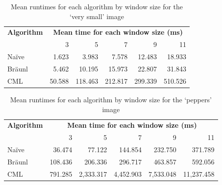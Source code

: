 \begin{table}
\centering
\caption[Mean runtimes for each algorithm for the `very small' image]{Mean runtimes for each algorithm by window size for the `very small' image}
\label{tab:median:verysmall}
\begin{tabular}{@{}lrrrrr@{}}
\toprule
\multicolumn{1}{c}{\textbf{Algorithm}} & \multicolumn{5}{c}{\textbf{Mean time for each window size (ms)}} \\
                              & 3        & 5         & 7         & 9         & 11       \\ \midrule
Naïve                         & 1.623    & 3.983     & 7.578     & 12.483    & 18.933   \\
Bräunl                        & 5.462    & 10.195    & 15.973    & 22.807    & 31.843   \\
CML                           & 50.588   & 118.463   & 212.817   & 299.339   & 510.526  \\ \bottomrule
\end{tabular}
\end{table}

\begin{table}
\centering
\caption[Mean runtimes for each algorithm for the `peppers' image]{
\label{tab:median:peppers}Mean runtimes for each algorithm by window size for the `peppers' image}
\begin{tabular}{@{}lrrrrr@{}}
\toprule
\multicolumn{1}{c}{\textbf{Algorithm}} & \multicolumn{5}{c}{\textbf{Mean time for each window size (ms)}}  \\
                              & 3       & 5         & 7         & 9         & 11         \\ \midrule
Naïve                         & 36.474  & 77.122    & 144.854   & 232.750   & 371.789    \\
Bräunl                        & 108.436 & 206.336   & 296.717   & 463.857   & 592.056    \\
CML                           & 791.285 & 2,333.317 & 4,452.903 & 7,533.048 & 11,237.458 \\ \bottomrule
\end{tabular}
\end{table}

